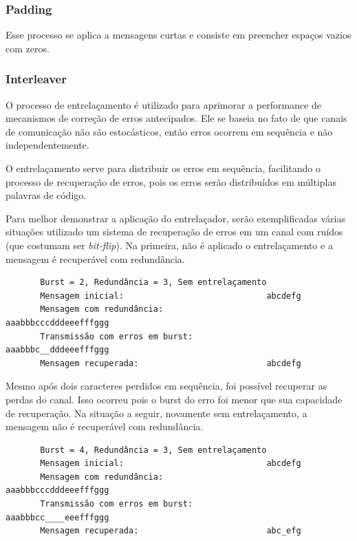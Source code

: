 	\subsubsection{Padding}
	
	Esse processo se aplica a mensagens curtas e consiste em preencher espaços vazios com zeros.
	
	\subsubsection{Interleaver}
	
	O processo de entrelaçamento é utilizado para aprimorar a performance de mecanismos de correção de erros antecipados. Ele se baseia no fato de que canais de comunicação não são estocásticos, então erros ocorrem em sequência e não independentemente. 
	
	O entrelaçamento serve para distribuir os erros em sequência, facilitando o processo de recuperação de erros, pois os erros serão distribuídos em múltiplas palavras de código. 
	
	Para melhor demonstrar a aplicação do entrelaçador, serão exemplificadas várias situações utilizado um sistema de recuperação de erros em um canal com ruídos (que costumam ser \textit{bit-flip}). Na primeira, não é aplicado o entrelaçamento e a mensagem é recuperável com redundância.

	\begin{verbatim}
	   Burst = 2, Redundância = 3, Sem entrelaçamento
	   Mensagem inicial:                             abcdefg
	   Mensagem com redundância:                     aaabbbcccdddeeefffggg
	   Transmissão com erros em burst:               aaabbbc__dddeeefffggg
	   Mensagem recuperada:                          abcdefg
	\end{verbatim}

	Mesmo após dois caracteres perdidos em sequência, foi possível recuperar as perdas do canal. Isso ocorreu pois o burst do erro foi menor que sua capacidade de recuperação. Na situação a seguir, novamente sem entrelaçamento, a mensagem não é recuperável com redundância.
	
	\begin{verbatim}
	   Burst = 4, Redundância = 3, Sem entrelaçamento
	   Mensagem inicial:                             abcdefg
	   Mensagem com redundância:                     aaabbbcccdddeeefffggg
	   Transmissão com erros em burst:               aaabbbcc____eeefffggg
	   Mensagem recuperada:                          abc_efg
	\end{verbatim}
	

